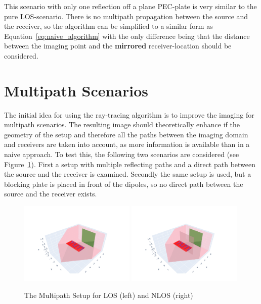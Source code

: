 This scenario with only one reflection off a plane PEC-plate is very similar to the pure LOS-scenario.
There is no multipath propagation between the source and the receiver, so the algorithm can be simplified to a similar form as Equation~\eqref{eq:naive_algorithm} with the only difference being that the distance between the imaging point and the \textbf{mirrored} receiver-location should be considered.



\section{Multipath Scenarios}
The initial idea for using the ray-tracing algorithm is to improve the imaging for multipath scenarios.
The resulting image should theoretically enhance if the geometry of the setup and therefore all the paths between the imaging domain and receivers are taken into account, as more information is available than in a naive approach.
To test this, the following two scenarios are considered (see Figure~\ref{fig:MultipathNLOS_setup}).
First a setup with multiple reflecting paths and a direct path between the source and the receiver is examined.
Secondly the same setup is used, but a blocking plate is placed in front of the dipoles, so no direct path between the source and the receiver exists.


\begin{figure}[ht]
    \centering
    \includegraphics[width=0.49\textwidth]{figures/setup_multipath_los.pdf}
    \includegraphics[width=0.49\textwidth]{figures/setup_multipath_nlos.pdf}
    \caption{The Multipath Setup for LOS (left) and NLOS (right)}\label{fig:MultipathNLOS_setup}
\end{figure}

